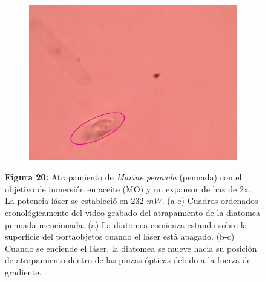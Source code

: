 \documentclass[10pt,aspectratio=1610,compress,dvipsnames]{beamer}
\begin{document}
\begin{frame}
{\begin{figure}
\begin{subfigure}[b]{0.3\textwidth}
     \end{subfigure}
     \hfill
     \begin{subfigure}[b]{0.3\textwidth}
         \centering
         \includegraphics[width=\textwidth]{Results/Fifth/pennate3water.png}
         \caption{}
         \label{fig:five over x}
     \end{subfigure}
        \captionsetup{labelformat = empty}
     \caption{\textbf{Figura 20:} Atrapamiento de \textit{Marine pennada} (pennada) con el objetivo de inmersión en aceite (MO) y un expansor de haz de 2x. La potencia láser se estableció en 232 $mW$. (a-c) Cuadros ordenados cronológicamente del video grabado del atrapamiento de la diatomea pennada mencionada. (a) La diatomea comienza estando sobre la superficie del portaobjetos cuando el láser está apagado. (b-c) Cuando se enciende el láser, la diatomea se mueve hacia su posición de atrapamiento dentro de las pinzas ópticas debido a la fuerza de gradiente.}
\label{WIFORTH1}
     
\end{figure}

}

\end{frame}
\end{document}
